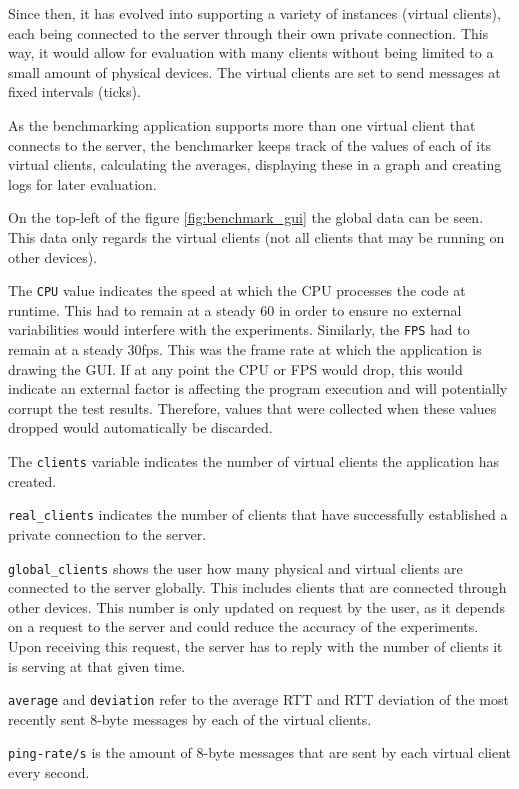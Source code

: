 \documentclass[bsc,frontabs,twoside,singlespacing,parskip,deptreport]{infthesis}     %
\begin{document}
Since then, it has evolved into supporting a variety of instances (virtual clients), each being connected to the server through their own private connection. This way, it would allow for evaluation with many clients without being limited to a small amount of physical devices. The virtual clients are set to send messages at fixed intervals (ticks).

As the benchmarking application supports more than one virtual client that connects to the server, the benchmarker keeps track of the values of each of its virtual clients, calculating the averages, displaying these in a graph and creating logs for later evaluation.

On the top-left of the figure \ref{fig:benchmark_gui} the global data can be seen. This data only regards the virtual clients (not all clients that may be running on other devices). 

The \texttt{CPU} value indicates the speed at which the CPU processes the code at runtime. This had to remain at a steady 60 in order to ensure no external variabilities would interfere with the experiments. Similarly, the \texttt{FPS} had to remain at a steady 30fps. This was the frame rate at which the application is drawing the GUI. If at any point the CPU or FPS would drop, this would indicate an external factor is affecting the program execution and will potentially corrupt the test results. Therefore, values that were collected when these values dropped would automatically be discarded.

The \texttt{clients} variable indicates the number of virtual clients the application has created. 

\texttt{real\_clients} indicates the number of clients that have successfully established a private connection to the server.

\texttt{global\_clients} shows the user how many physical and virtual clients are connected to the server globally. This includes clients that are connected through other devices. This number is only updated on request by the user, as it depends on a request to the server and could reduce the accuracy of the experiments. Upon receiving this request, the server has to reply with the number of clients it is serving at that given time.

\texttt{average} and \texttt{deviation} refer to the average RTT and RTT deviation of the most recently sent 8-byte messages by each of the virtual clients.

\texttt{ping-rate/s} is the amount of 8-byte messages that are sent by each virtual client every second.
\end{document}

